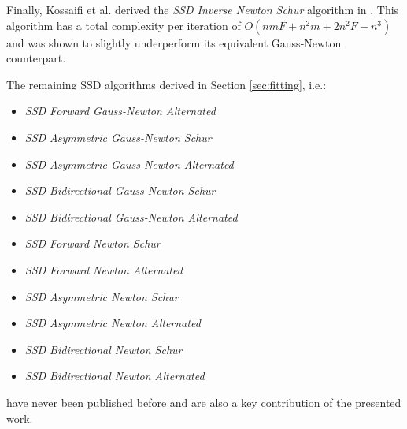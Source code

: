 Finally, Kossaifi et al. derived the \emph{SSD Inverse Newton Schur} algorithm in \cite{Kossaifi2014}. This algorithm has a total complexity per iteration of $O(nmF + n^2m + 2n^2F + n^3)$ and was shown to slightly underperform its equivalent Gauss-Newton counterpart.

The remaining SSD algorithms derived in Section \ref{sec:fitting}, i.e.:
\begin{itemize}
\item \emph{SSD Forward Gauss-Newton Alternated}
\item \emph{SSD Asymmetric Gauss-Newton Schur}
\item \emph{SSD Asymmetric Gauss-Newton Alternated}
\item \emph{SSD Bidirectional Gauss-Newton Schur}
\item \emph{SSD Bidirectional Gauss-Newton Alternated}
\item \emph{SSD Forward Newton Schur}
\item \emph{SSD Forward Newton Alternated}
\item \emph{SSD Asymmetric Newton Schur}
\item \emph{SSD Asymmetric Newton Alternated}
\item \emph{SSD Bidirectional Newton Schur}
\item \emph{SSD Bidirectional Newton Alternated}
\end{itemize}
have never been published before and are also a key contribution of the presented work.
